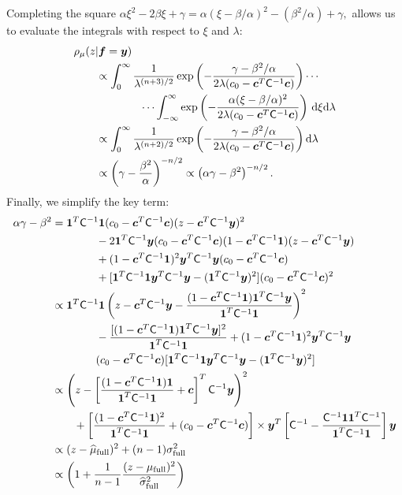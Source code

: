 \documentclass{iitthesis}          %
\newcommand{\bm}[1]{\boldsymbol{#1}}
\newcommand{\D}[1]{\text{d}{#1}}
\newcommand{\vc}{\bm{c}}
\newcommand{\vf}{\bm{f}}
\newcommand{\vy}{\bm{y}}
\newcommand{\vone}{\bm{1}}
\newcommand{\mC}{\mathsf{C}}
\begin{document}
Completing the square $
\alpha \xi^2 -2 \beta \xi + \gamma 
= \alpha (\xi -\beta/\alpha)^2  - (\beta^2/\alpha) + \gamma,
$
allows us to evaluate the integrals with respect to $\xi$ and $\lambda$:
\begin{align*}
\MoveEqLeft{\rho_{\mu}(z | \vf = \vy)} \\
& \propto \displaystyle \int_{0}^\infty  \frac{1}{\lambda^{(n+3)/2}}  \exp\left( -\frac{  \gamma - \beta^2/\alpha}{2\lambda(c_0  -\vc ^T \mC^{-1} \vc)} \right)  \cdots \\
& \qquad \qquad \cdots \int_{-\infty}^\infty  \exp\left( -\frac{\alpha (\xi -\beta/\alpha)^2}{2\lambda(c_0  -\vc ^T \mC^{-1} \vc)} \right) \, \D \xi \D \lambda \\
& \propto \displaystyle \int_{0}^\infty  \frac{1}{\lambda^{(n+2)/2}}  \exp\left( -\frac{  \gamma - \beta^2/\alpha}{2\lambda(c_0  -\vc ^T \mC^{-1} \vc)} \right) \D \lambda \\
& \propto \left(\gamma - \frac{\beta^2}{\alpha}\right)^{-n/2} \propto \left(\alpha \gamma - \beta^2\right)^{-n/2}.
\end{align*}
Finally, we simplify the key term:
\begin{align*}
\alpha \gamma - \beta^2 
& = \vone^T \mC^{-1} \vone (c_0  -\vc ^T \mC^{-1} \vc) (z - \vc^T \mC^{-1} \vy )^2 \\
& \qquad \qquad - 2 \vone^T \mC^{-1} \vy (c_0  -\vc ^T \mC^{-1} \vc)(1 - \vc^T \mC^{-1} \vone)(z - \vc^T \mC^{-1} \vy ) \\
& \qquad \qquad + (1 - \vc^T \mC^{-1} \vone)^2 \vy^T \mC^{-1} \vy (c_0  -\vc ^T \mC^{-1} \vc) \\
&\qquad \qquad  + [\vone^T \mC^{-1} \vone \vy^T \mC^{-1} \vy - (\vone^T \mC^{-1} \vy)^2](c_0  -\vc ^T \mC^{-1} \vc)^2  \\
& \propto \vone^T \mC^{-1} \vone  \left (z - \vc^T \mC^{-1} \vy - \frac{(1 - \vc^T \mC^{-1} \vone)\vone^T \mC^{-1} \vy}{\vone^T \mC^{-1} \vone } \right )^2 \\
& \qquad \qquad -  \frac{[(1 - \vc^T \mC^{-1} \vone)\vone^T \mC^{-1} \vy]^2}{\vone^T \mC^{-1} \vone }  
+ (1 - \vc^T \mC^{-1} \vone)^2 \vy^T \mC^{-1} \vy \\
& \qquad \qquad (c_0  -\vc ^T \mC^{-1} \vc) [\vone^T \mC^{-1} \vone  \vy^T \mC^{-1} \vy
- (\vone^T \mC^{-1} \vy)^2] \\
& \propto \left (z - \left[ \frac{(1 - \vc^T \mC^{-1} \vone)\vone}{\vone^T \mC^{-1} \vone } + \vc \right]^T \mC^{-1} \vy \right )^2 \\
& \qquad  + \left[\frac{(1 - \vc^T \mC^{-1} \vone)^2}{\vone^T \mC^{-1} \vone} + (c_0  -\vc ^T \mC^{-1} \vc) \right] \times \vy^T\left[ \mC^{-1} 
- \frac{ \mC^{-1} \vone\vone^T \mC^{-1}}{\vone^T \mC^{-1} \vone}  \right]\vy
\\
& \propto (z - \widehat{\mu}_{\textup{full}})^2 + (n-1) \sigma_{\textup{full}}^2
\\
& \propto \left(1 +  \frac{1}{n-1} \frac{(z - \mu_{\textup{full}})^2}{\widehat{\sigma}_{\textup{full}}^2} \right)
\end{align*}
\end{document}
